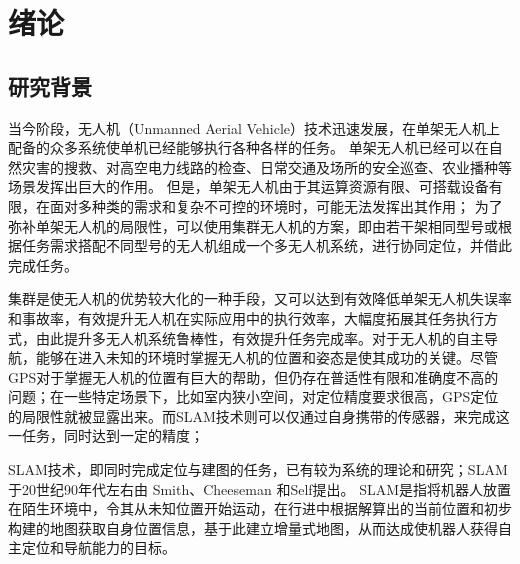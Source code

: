 \chapter{绪论}\label{preface}

\section{研究背景}

当今阶段，无人机（Unmanned Aerial Vehicle）技术迅速发展，在单架无人机上配备的众多系统使单机已经能够执行各种各样的任务。
单架无人机已经可以在自然灾害的搜救、对高空电力线路的检查、日常交通及场所的安全巡查、农业播种等场景发挥出巨大的作用。
但是，单架无人机由于其运算资源有限、可搭载设备有限，在面对多种类的需求和复杂不可控的环境时，可能无法发挥出其作用；
为了弥补单架无人机的局限性，可以使用集群无人机的方案，即由若干架相同型号或根据任务需求搭配不同型号的无人机组成一个多无人机系统，进行协同定位，并借此完成任务。


集群是使无人机的优势较大化的一种手段，又可以达到有效降低单架无人机失误率和事故率，有效提升无人机在实际应用中的执行效率，大幅度拓展其任务执行方式，由此提升多无人机系统鲁棒性，有效提升任务完成率。对于无人机的自主导航，能够在进入未知的环境时掌握无人机的位置和姿态是使其成功的关键。尽管GPS对于掌握无人机的位置有巨大的帮助，但仍存在普适性有限和准确度不高的问题；在一些特定场景下，比如室内狭小空间，对定位精度要求很高，GPS定位的局限性就被显露出来。而SLAM技术则可以仅通过自身携带的传感器，来完成这一任务，同时达到一定的精度；

SLAM技术，即同时完成定位与建图的任务，已有较为系统的理论和研究；SLAM于20世纪90年代左右由 Smith、Cheeseman 和Self提出。
SLAM是指将机器人放置在陌生环境中，令其从未知位置开始运动，在行进中根据解算出的当前位置和初步构建的地图获取自身位置信息，基于此建立增量式地图，从而达成使机器人获得自主定位和导航能力的目标\cite{1}。



